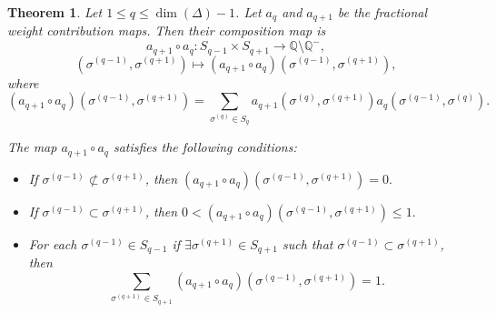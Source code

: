 \documentclass[10pt,a4paper]{amsart}
\newtheorem{theorem}{Theorem}
\begin{document}
\begin{theorem}
Let $1 \le q \le \dim(\Delta)-1$. 
Let $a_q$ and $a_{q+1}$ be the fractional weight contribution maps. 
Then their composition map is
\[
a_{q+1} \circ a_q : S_{q-1} \times S_{q+1} 
\longrightarrow \mathbb{Q} \setminus \mathbb{Q}^-,
\]
\[
(\sigma^{(q-1)}, \sigma^{(q+1)}) 
\longmapsto 
(a_{q+1} \circ a_q)(\sigma^{(q-1)}, \sigma^{(q+1)}),
\]
where
\[
(a_{q+1} \circ a_q)(\sigma^{(q-1)}, \sigma^{(q+1)})
=
\sum_{\sigma^{(q)} \in S_q}
a_{q+1}(\sigma^{(q)}, \sigma^{(q+1)})
a_q(\sigma^{(q-1)}, \sigma^{(q)}).
\]

The map $a_{q+1} \circ a_q$ satisfies the following conditions:

\begin{itemize}
    \item[(i)] If $\sigma^{(q-1)} \not\subset \sigma^{(q+1)}$, then
    \(
    (a_{q+1} \circ a_q)(\sigma^{(q-1)}, \sigma^{(q+1)}) = 0.
    \)

    \item[(ii)] If $\sigma^{(q-1)} \subset \sigma^{(q+1)}$, then
    \(
    0 < (a_{q+1} \circ a_q)(\sigma^{(q-1)}, \sigma^{(q+1)}) \le 1.
    \)

    \item[(iii)] For each $\sigma^{(q-1)} \in S_{q-1}$ if $\exists \sigma^{(q+1)} \in S_{q+1}$ such that $\sigma^{(q-1)} \subset \sigma^{(q+1)}$, then
    \[
    \sum_{\sigma^{(q+1)} \in S_{q+1}}
    (a_{q+1} \circ a_q)(\sigma^{(q-1)}, \sigma^{(q+1)}) = 1.
    \]
\end{itemize}
\end{theorem}
\end{document}
